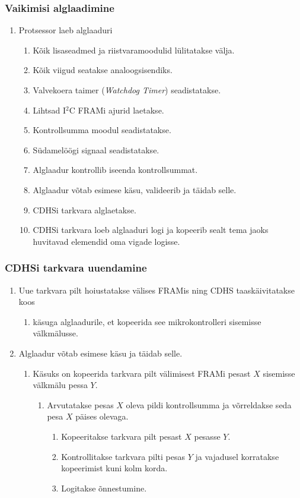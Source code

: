 \documentclass[12pt,a4paper]{article}
\newcommand{\iic}{I\({}^2\)C }
\begin{document}
\subsubsection{Vaikimisi alglaadimine}
\begin{enumerate}
\item Protsessor laeb alglaaduri
	\begin{enumerate}
	\item Kõik lisaseadmed ja riistvaramoodulid lülitatakse välja.
	\item Kõik viigud seatakse analoogsisendiks.
	\item Valvekoera taimer (\textit{Watchdog Timer}) seadistatakse.
	\item Lihtsad \iic FRAMi ajurid laetakse.
	\item Kontrollsumma moodul seadistatakse.
	\item Südamelöögi signaal seadistatakse.
	\item Alglaadur kontrollib iseenda kontrollsummat.
	\item Alglaadur võtab esimese käsu, valideerib ja täidab selle.
	\item CDHSi tarkvara alglaetakse.
	\item CDHSi tarkvara loeb alglaaduri logi ja kopeerib sealt tema jaoks
		huvitavad elemendid oma vigade logisse.
	\end{enumerate}
\end{enumerate}

\subsubsection{CDHSi tarkvara uuendamine}
\begin{enumerate}
	\item Uue tarkvara pilt hoiustatakse välises FRAMis ning CDHS
		taaskäivitatakse koos
		\begin{enumerate}
			\item käsuga alglaadurile, et kopeerida see mikrokontrolleri
				sisemisse välkmälusse.
		\end{enumerate}
	\item Alglaadur võtab esimese käsu ja täidab selle.
		\begin{enumerate}
			\item Käsuks on kopeerida tarkvara pilt välimisest FRAMi pesast \(X\)
				sisemisse välkmälu pessa \(Y\).
				\begin{enumerate}
					\item Arvutatakse pesas \(X\) oleva pildi kontrollsumma ja
						võrreldakse seda pesa \(X\) päises olevaga.
						\begin{enumerate}
							\item Kopeeritakse tarkvara pilt pesast \(X\) pesasse \(Y\).
							\item Kontrollitakse tarkvara pilti pesas \(Y\) ja
								vajadusel korratakse kopeerimist kuni kolm
								korda.
							\item Logitakse õnnestumine.
						\end{enumerate}
				\end{enumerate}
		\end{enumerate}
\end{enumerate}
\end{document}
